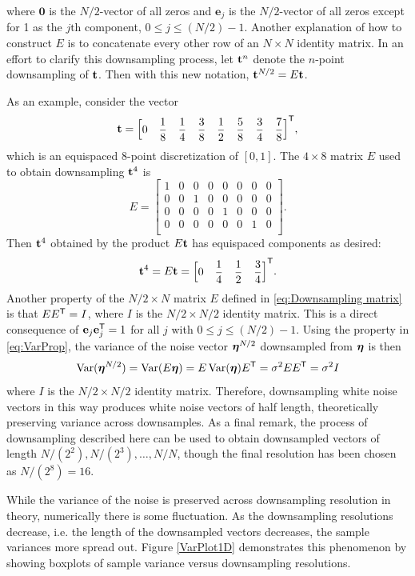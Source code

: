 where $\mathbf{0}$ is the $N/2$-vector of all zeros and $\mathbf{e}_j$ is the $N/2$-vector of all zeros except for 1 as the $j\text{th}$ component, $0 \leq j \leq (N/2)-1$. Another explanation of how to construct $E$ is to concatenate every other row of an $N \times N$ identity matrix. In an effort to clarify this downsampling process, let $\mathbf{t}^{n}$ denote the $n$-point downsampling of $\mathbf{t}$. Then with this new notation, $\mathbf{t}^{N/2} = E\mathbf{t}$. \par
As an example, consider the vector
\[\mathbf{t} = {\begin{bmatrix}
0 & \dfrac{1}{8} & \dfrac{1}{4} & \dfrac{3}{8} & \dfrac{1}{2} & \dfrac{5}{8} & \dfrac{3}{4} & \dfrac{7}{8}
\end{bmatrix}}^\mathsf{T},\]
which is an equispaced 8-point discretization of $[0,1]$. The $4 \times 8$ matrix $E$ used to obtain downsampling $\mathbf{t}^{4}$ is
\[E = \begin{bmatrix}
1 & 0 & 0 & 0 & 0 & 0 & 0 & 0 \\
0 & 0 & 1 & 0 & 0 & 0 & 0 & 0 \\
0 & 0 & 0 & 0 & 1 & 0 & 0 & 0 \\
0 & 0 & 0 & 0 & 0 & 0 & 1 & 0 \\
\end{bmatrix}.\]
Then $\mathbf{t}^4$ obtained by the product $E\mathbf{t}$ has equispaced components as desired:
\[\mathbf{t}^4 = E\mathbf{t} = {\begin{bmatrix}
0 & \dfrac{1}{4} & \dfrac{1}{2} & \dfrac{3}{4}
\end{bmatrix}}^\mathsf{T}.\]
\indent Another property of the $N/2 \times N$ matrix $E$ defined in \eqref{eq:Downsampling matrix} is that $E{E}^\mathsf{T} = I$, where $I$ is the $N/2 \times N/2$ identity matrix.  This is a direct consequence of $\mathbf{e}_j{\mathbf{e}}^\mathsf{T}_j = 1$ for all $j$ with $0 \leq j \leq (N/2)-1$. Using the property in \eqref{eq:VarProp}, the variance of the  noise vector $\boldsymbol{\eta}^{N/2}$ downsampled from $\boldsymbol{\eta}$ is then
\[\operatorname{Var}(\boldsymbol{\eta}^{N/2}) = \operatorname{Var}(E\boldsymbol{\eta}) = E\operatorname{Var}(\boldsymbol{\eta}){E}^\mathsf{T} = \sigma^2E{E}^\mathsf{T} = \sigma^2I\]
where $I$ is the $N/2 \times N/2$ identity matrix. Therefore, downsampling white noise vectors in this way produces white noise vectors of half length, theoretically preserving variance across downsamples. As a final remark, the process of downsampling described here can be used to obtain downsampled vectors of length $N/(2^2), N/(2^3), \ldots, N/N$, though the final resolution has been chosen as $N/(2^8) = 16$. \par
While the variance of the noise is preserved across downsampling resolution in theory, numerically there is some fluctuation. As the downsampling resolutions decrease, i.e. the length of the downsampled vectors decreases, the sample variances more spread out. Figure \ref{VarPlot1D} demonstrates this phenomenon by showing boxplots of sample variance versus downsampling resolutions. %


